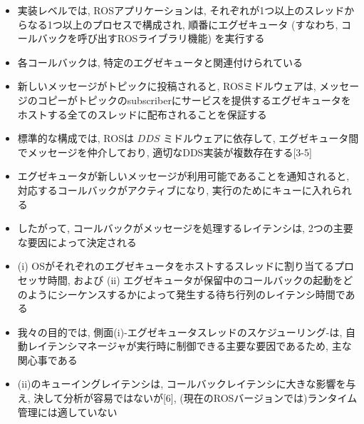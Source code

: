 \begin{frame}{}
    \begin{itemize}
        \item 実装レベルでは, ROSアプリケーションは, それぞれが1つ以上のスレッドからなる1つ以上のプロセスで構成され, 順番にエグゼキュータ (すなわち, コールバックを呼び出すROSライブラリ機能) を実行する
        \item 各コールバックは, 特定のエグゼキュータと関連付けられている
        \item 新しいメッセージがトピックに投稿されると, ROSミドルウェアは, メッセージのコピーがトピックのsubscriberにサービスを提供するエグゼキュータをホストする全てのスレッドに配布されることを保証する
        \item 標準的な構成では, ROSは $D D S$ ミドルウェアに依存して, エグゼキュータ間でメッセージを仲介しており, 適切なDDS実装が複数存在する[3-5]
    \end{itemize}
\end{frame}

\begin{frame}{}
    \begin{itemize}
        \item エグゼキュータが新しいメッセージが利用可能であることを通知されると, 対応するコールバックがアクティブになり, 実行のためにキューに入れられる
        \item したがって, コールバックがメッセージを処理するレイテンシは, 2つの主要な要因によって決定される
        \item (i) OSがそれぞれのエグゼキュータをホストするスレッドに割り当てるプロセッサ時間, および (ii) エグゼキュータが保留中のコールバックの起動をどのようにシーケンスするかによって発生する待ち行列のレイテンシ時間である
    \end{itemize}
\end{frame}

\begin{frame}{}
    \begin{itemize}
        \item 我々の目的では, 側面(i)-エグゼキュータスレッドのスケジューリング-は, 自動レイテンシマネージャが実行時に制御できる主要な要因であるため, 主な関心事である
        \item (ii)のキューイングレイテンシは, コールバックレイテンシに大きな影響を与え, 決して分析が容易ではないが[6], (現在のROSバージョンでは)ランタイム管理には適していない
    \end{itemize}
\end{frame}

